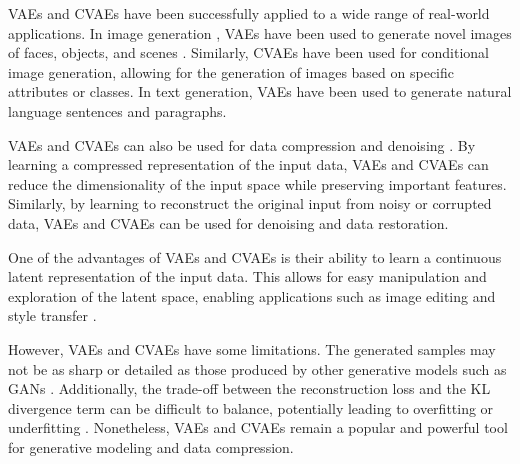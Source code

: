 
VAEs and CVAEs have been successfully applied to a wide range of real-world applications. In image generation \cite{pml2Book}, VAEs have been used to generate novel images of faces, objects, and scenes \cite{pml2Book}. Similarly, CVAEs have been used for conditional image generation, allowing for the generation of images based on specific attributes or classes. In text generation, VAEs have been used to generate natural language sentences and paragraphs.

VAEs and CVAEs can also be used for data compression \cite{VAE_Compression} and denoising \cite{VAE_denoising}. By learning a compressed representation of the input data, VAEs and CVAEs can reduce the dimensionality of the input space while preserving important features. Similarly, by learning to reconstruct the original input from noisy or corrupted data, VAEs and CVAEs can be used for denoising and data restoration.

One of the advantages of VAEs and CVAEs is their ability to learn a continuous latent representation of the input data. This allows for easy manipulation and exploration of the latent space, enabling applications such as image editing and style transfer \cite{VAE}.

However, VAEs and CVAEs have some limitations. The generated samples may not be as sharp or detailed as those produced by other generative models such as GANs \cite{VAEvsGAN}. Additionally, the trade-off between the reconstruction loss and the KL divergence term can be difficult to balance, potentially leading to overfitting or underfitting \cite{KL_Loss_R_Loss}. Nonetheless, VAEs and CVAEs remain a popular and powerful tool for generative modeling and data compression.


% 

